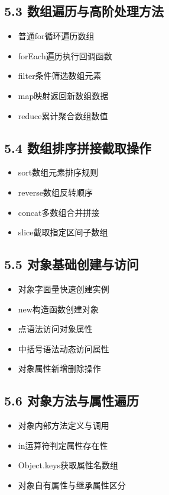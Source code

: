 \subsection{5.3 数组遍历与高阶处理方法}
\begin{itemize}
\item 普通for循环遍历数组
\item forEach遍历执行回调函数
\item filter条件筛选数组元素
\item map映射返回新数组数据
\item reduce累计聚合数组数值
\end{itemize}

\subsection{5.4 数组排序拼接截取操作}
\begin{itemize}
\item sort数组元素排序规则
\item reverse数组反转顺序
\item concat多数组合并拼接
\item slice截取指定区间子数组
\end{itemize}

\subsection{5.5 对象基础创建与访问}
\begin{itemize}
\item 对象字面量快速创建实例
\item new构造函数创建对象
\item 点语法访问对象属性
\item 中括号语法动态访问属性
\item 对象属性新增删除操作
\end{itemize}

\subsection{5.6 对象方法与属性遍历}
\begin{itemize}
\item 对象内部方法定义与调用
\item in运算符判定属性存在性
\item Object.keys获取属性名数组
\item 对象自有属性与继承属性区分
\end{itemize}

